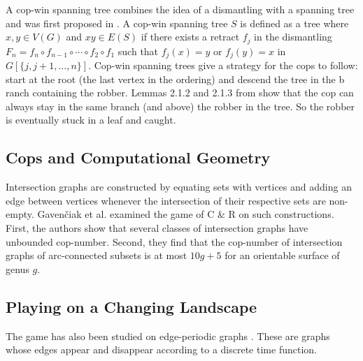A cop-win spanning tree combines the idea of a dismantling with a spanning tree
and was first proposed in \cite{clarke2002constrained}. A cop-win spanning tree $S$ is defined as a tree where $x,y\in V(G)$ and $xy \in E(S)$ if there exists a retract $f_j$ in the dismantling
$F_n = f_{n} \circ f_{n-1} \circ \cdots \circ f_{2} \circ f_1$ such that $f_j (x) = y$ or $f_j (y) = x$ in $G[\{j, j+1, \dots, n \}]$. Cop-win spanning trees give a strategy for the cops to follow: start at the root
(the last vertex in the ordering) and descend the tree in the b ranch containing the robber.
Lemmas 2.1.2 and 2.1.3 from \cite{clarke2002constrained} show that the cop
can always stay in the same branch (and above) the robber in the tree. So the
robber is eventually stuck in a leaf and caught.

\subsection{Cops and Computational Geometry}

Intersection graphs are constructed by equating sets with vertices and adding an edge between vertices whenever the intersection of their respective sets are non-empty. Gaven{\v{c}}iak et al. \cite{gavenvciak2018cops} examined the game of C \& R on such constructions. First, the authors show that several classes of intersection graphs have unbounded cop-number. Second, they find that the cop-number of intersection graphs of arc-connected subsets is at most $10g+5$ for an orientable surface of genus $g$.

\subsection{Playing on a Changing Landscape}

The game has also been studied on edge-periodic graphs \cite{erlebach2020game}. These are graphs whose edges appear and disappear according to a discrete time function.
